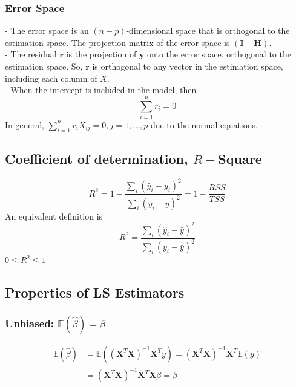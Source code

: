 \documentclass[11pt,a4paper]{article}
\begin{document}
\subsubsection{Error Space}
- The error space is an $(n-p)$-dimensional space that is orthogonal to the estimation space. The projection matrix of the error space is $(\mathbf{I}-\mathbf{H})$.\\
- The residual $\mathbf{r}$ is the projection of $\boldsymbol{y}$ onto the error space, orthogonal to the estimation space. So, $\mathbf{r}$ is orthogonal to any vector in the estimation space, including each column of $X$.\\
- When the intercept is included in the model, then
$$
\sum_{i=1}^{n} r_{i}=0
$$
In general, $\sum_{i=1}^{n} r_{i} X_{i j}=0, j=1, \ldots, p$ due to the normal equations.

\subsection{Coeﬃcient of determination, $R-$Square}
$$
R^{2}=1-\frac{\sum_{i}\left(\hat{y}_{i}-y_{i}\right)^{2}}{\sum_{i}\left(y_{i}-\bar{y}\right)^{2}}=1-\frac{R S S}{T S S}
$$
An equivalent definition is
$$
R^{2}=\frac{\sum_{i}\left(\hat{y}_{i}-\bar{y}\right)^{2}}{\sum_{i}\left(y_{i}-\bar{y}\right)^{2}}
$$
$0 \leq R^{2} \leq 1$
\subsection{Properties of LS Estimators}
\subsubsection{Unbiased: $\mathbb{E}(\hat{\beta})=\beta$}
\begin{equation}
    \begin{aligned}
        \mathbb{E}(\hat{\beta})&=\mathbb{E}(\left(\mathbf{X}^{T} \mathbf{X}\right)^{-1} \mathbf{X}^{T} y)=\left(\mathbf{X}^{T} \mathbf{X}\right)^{-1} \mathbf{X}^{T} \mathbb{E}(y)\\
        &=\left(\mathbf{X}^{T} \mathbf{X}\right)^{-1} \mathbf{X}^{T}\mathbf{X}\beta=\beta
    \end{aligned}
    \nonumber
\end{equation}
\end{document}

